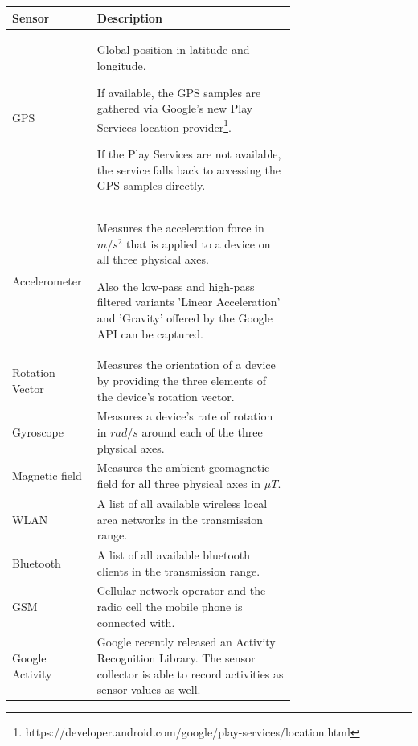 \begin{tabular}{|l|p{0.7\linewidth}|}
  \hline
  Sensor & Description \\
  \hline
  GPS                 & Global position in latitude and longitude. 

                        If available, the GPS samples are gathered via
                        Google's new Play Services location
                        provider\footnote{https://developer.android.com/google/play-services/location.html}.
                        
                        If the Play Services are not available, the service falls back to
                        accessing the GPS samples directly.
  \\ \hline
  Accelerometer       & Measures the acceleration force in $m/s^2$
                        that is applied to a device on all three
                        physical axes. 

                        Also the low-pass and high-pass filtered
                        variants 'Linear Acceleration' and 'Gravity' offered by the Google
                        API can be captured.
  \\ 
  Rotation Vector     & Measures the orientation of a device by
                        providing the three elements of the device's
                        rotation vector.  
  \\
  Gyroscope           & Measures a device's rate of rotation in
                        $rad/s$ around each of the three physical
                        axes. 
  \\ 
  Magnetic field      & Measures the ambient geomagnetic field for all
                        three physical axes in $\mu T$. 
  \\ \hline
  WLAN                & A list of all available wireless local area
                        networks in the transmission range. 
  \\
  Bluetooth           & A list of all available bluetooth clients in
                        the transmission range. 
  \\
  GSM                 & Cellular network operator and the radio cell
                        the mobile phone is connected with. 
  \\ \hline
  Google Activity     & Google recently released an Activity
                        Recognition Library. The sensor collector is able to record activities as sensor
                        values as well. 
  \\
  \hline
\end{tabular}


